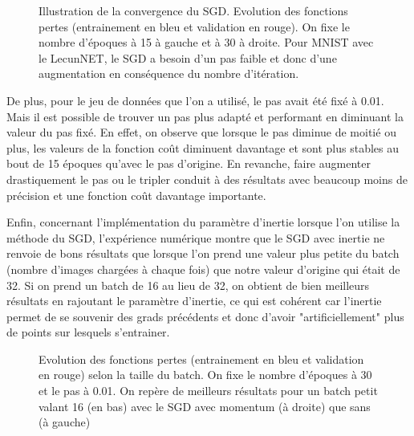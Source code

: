 \documentclass{article}
\begin{document}
\bigskip

\bigskip

\begin{figure}[h]
      \centering
      \caption{Illustration de la convergence du SGD. Evolution des fonctions pertes (entrainement en bleu et validation en rouge). On fixe le nombre d'époques à 15 à gauche et à 30 à droite. Pour MNIST avec le LecunNET, le SGD a besoin d'un pas faible et donc d'une augmentation en conséquence du nombre d'itération.}
      \label{fig:both_pictures}
    \end{figure}

\newpage

De plus, pour le jeu de données que l'on a utilisé, le pas avait été fixé à 0.01. Mais il est possible de trouver un pas plus adapté et performant en diminuant la valeur du pas fixé. En effet, on observe que lorsque le pas diminue de moitié ou plus, les valeurs de la fonction coût diminuent davantage et sont plus stables au bout de 15 époques qu'avec le pas d'origine. En revanche, faire augmenter drastiquement le pas ou le tripler conduit à des résultats avec beaucoup moins de précision et une fonction coût davantage importante.

\bigskip

Enfin, concernant l'implémentation du paramètre d'inertie lorsque l'on utilise la méthode du SGD, l'expérience numérique montre que le SGD avec inertie ne renvoie de bons résultats que lorsque l'on prend une valeur plus petite du batch (nombre d'images chargées à chaque fois) que notre valeur d'origine qui était de 32. Si on prend un batch de 16 au lieu de 32, on obtient de bien meilleurs résultats en rajoutant le paramètre d'inertie, ce qui est cohérent car l'inertie permet de se souvenir des grads précédents et donc d'avoir "artificiellement" plus de points sur lesquels s'entrainer.

\begin{figure}[!htb]
      \centering
      \caption{Evolution des fonctions pertes (entrainement en bleu et
validation en rouge) selon la taille du batch. On fixe le nombre d’époques à 30 et le pas à 0.01. On repère de meilleurs résultats pour un batch petit valant 16 (en bas) avec le SGD avec momentum (à droite) que sans (à gauche)}
      \label{fig:both_pictures}
    \end{figure}
\end{document}
